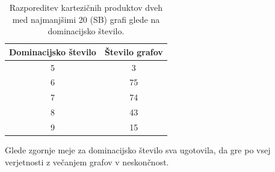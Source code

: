 \documentclass{article}
\begin{document}
\begin{table}[h!]
    \centering
    \begin{tabular}{|c|c|}
        \hline
        Dominacijsko število & Število grafov \\ \hline
        5 & 3 \\ \hline
        6 & 75 \\ \hline
        7 & 74 \\ \hline
        8 & 43 \\ \hline
        9 & 15 \\ \hline
    \end{tabular}
    \caption{Razporeditev kartezičnih produktov dveh med najmanjšimi 20 (SB) grafi glede na dominacijsko število.}
    
\end{table}

Glede zgornje meje za dominacijsko število sva ugotovila, da gre po vsej verjetnosti z večanjem grafov v 
neskončnost.
\end{document}
